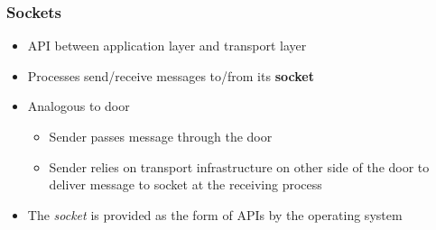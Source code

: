 \subsubsection{Sockets}
\begin{itemize}
	\item API between application layer and transport layer
	\item Processes send/receive messages to/from its \textbf{socket}
	\item Analogous to door
	\begin{itemize}
		\item Sender passes message through the door
		\item Sender relies on transport infrastructure on other side of the door to deliver message to socket at the receiving process
	\end{itemize}
	\item The \textit{socket} is provided as the form of APIs by the operating system
\end{itemize}

